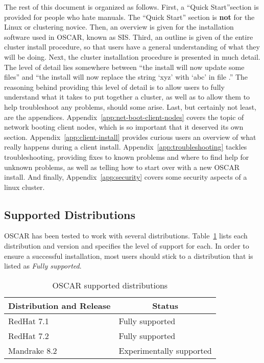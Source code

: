 The rest of this document is organized as follows.  First, a ``Quick
Start''section is provided for people who hate manuals.  The ``Quick
Start'' section is {\bf not} for the Linux or clustering novice. Then,
an overview is given for the installation software used in OSCAR,
known as SIS.  Third, an outline is given of the entire cluster
install procedure, so that users have a general understanding of what
they will be doing.  Next, the cluster installation procedure is
presented in much detail.  The level of detail lies somewhere between
``the install will now update some files'' and ``the install will now
replace the string `xyz' with `abc' in file .'' The
reasoning behind providing this level of detail is to allow users to
fully understand what it takes to put together a cluster, as well as
to allow them to help troubleshoot any problems, should some arise.
Last, but certainly not least, are the appendices.
Appendix~\ref{app:net-boot-client-nodes} covers the topic of network
booting client nodes, which is so important that it deserved its own
section.  Appendix~\ref{app:client-install} provides curious users an
overview of what really happens during a client install.
Appendix~\ref{app:troubleshooting} tackles troubleshooting, providing
fixes to known problems and where to find help for unknown problems,
as well as telling how to start over with a new OSCAR install.  And
finally, Appendix~\ref{app:security} covers some security aspects of a
linux cluster.

\subsection{Supported Distributions}

OSCAR has been tested to work with several distributions. Table~\ref{tab:oscar-distro-support}
lists each distribution and version and specifies the level of support for each. In order to ensure
a successful installation, most users should stick to a distribution that is listed as \emph{Fully supported}.

\begin{table}[htbp]
  \begin{center}
    \begin{tabular}{|l|p{3in}|}
      \hline
      \multicolumn{1}{|c|}{Distribution and Release} &
      \multicolumn{1}{|c|}{Status} \\
      \hline
      \hline
      RedHat 7.1 & Fully supported \\
%
      RedHat 7.2 & Fully supported \\
%
      Mandrake 8.2 & Experimentally supported \\
      \hline
    \end{tabular}
    \caption{OSCAR supported distributions}
    \label{tab:oscar-distro-support}
  \end{center}
\end{table}
